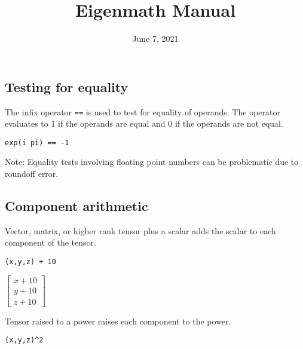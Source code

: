 \documentclass[12pt]{article}
\title{Eigenmath Manual}
\date{June 7, 2021}
\author{}
\begin{document}
\maketitle

\tableofcontents

\newpage





\subsection{Testing for equality}
The infix operator \verb$==$ is used to test for equality of operands.
The operator evaluates to 1 if the operands are equal and 0 if the operands are not equal.

\begin{Verbatim}[formatcom=\color{blue}]
exp(i pi) == -1
\end{Verbatim}


\bigskip
\noindent
Note: Equality tests involving floating point numbers
can be problematic due to roundoff error.















\subsection{Component arithmetic}

\noindent
Vector, matrix, or higher rank tensor plus a scalar adds the scalar to each component of the tensor.

{\color{blue}\begin{verbatim}
(x,y,z) + 10
\end{verbatim}}

\noindent
$\begin{bmatrix}x+10\\y+10\\z+10\end{bmatrix}$

\bigskip
\noindent
Tensor raised to a power raises each component to the power.

{\color{blue}\begin{verbatim}
(x,y,z)^2
\end{verbatim}}
\end{document}
